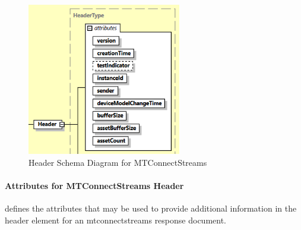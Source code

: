 \documentclass{mtconnect}	%
\begin{document}
\begin{figure}[ht]
  \centering
  \includegraphics[width=0.6\textwidth]{figures/header-schema-diagram-for-mtconnectstreams.png}
  \caption{Header Schema Diagram for MTConnectStreams}
  \label{fig:header-schema-diagram-for-mtconnectstreams}
\end{figure}

\FloatBarrier

\paragraph{Attributes for MTConnectStreams Header}\mbox{}

 defines the attributes that may be used to provide additional information in the \gls{header} element for an \gls{mtconnectstreams response document}.
\end{document}
